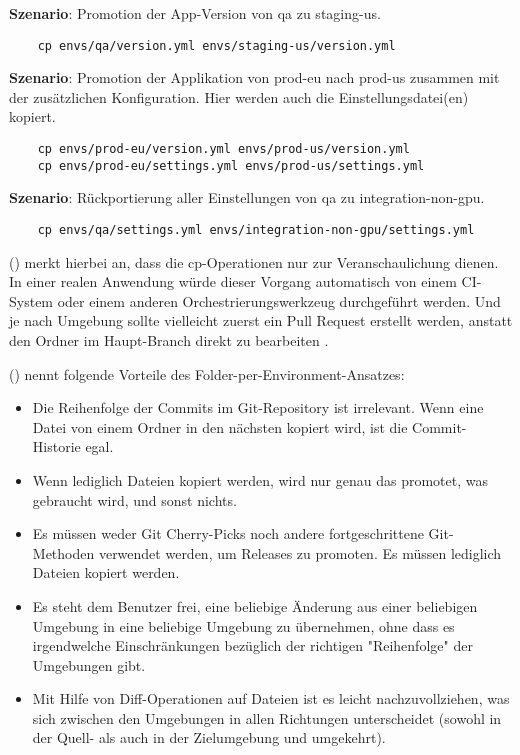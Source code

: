 \noindent
\textbf{Szenario}: Promotion der App-Version von qa zu staging-us.

\begin{verbatim}
	cp envs/qa/version.yml envs/staging-us/version.yml
\end{verbatim}

\noindent
\textbf{Szenario}: Promotion der Applikation von prod-eu nach prod-us zusammen mit der zusätzlichen Konfiguration. Hier werden auch die Einstellungsdatei(en) kopiert.

\begin{verbatim}
	cp envs/prod-eu/version.yml envs/prod-us/version.yml
	cp envs/prod-eu/settings.yml envs/prod-us/settings.yml
\end{verbatim}

\noindent
\textbf{Szenario}: Rückportierung aller Einstellungen von qa zu integration-non-gpu.

\begin{verbatim}
	cp envs/qa/settings.yml envs/integration-non-gpu/settings.yml
\end{verbatim}

\noindent
\citeauthor{codefreshHowToModelGitOpsEnvironmentsAndPromote} (\citeyear{codefreshHowToModelGitOpsEnvironmentsAndPromote})
merkt hierbei an,
dass die cp-Operationen nur zur Veranschaulichung dienen. 
In einer realen Anwendung würde dieser Vorgang automatisch von einem CI-System 
oder einem anderen Orchestrierungswerkzeug durchgeführt werden. Und je nach Umgebung 
sollte vielleicht zuerst ein Pull Request erstellt werden, anstatt den Ordner im Haupt-Branch direkt zu bearbeiten
\autocite{codefreshHowToModelGitOpsEnvironmentsAndPromote}.
\bigskip

\noindent
\citeauthor{codefreshHowToModelGitOpsEnvironmentsAndPromote} (\citeyear{codefreshHowToModelGitOpsEnvironmentsAndPromote})
nennt folgende Vorteile des Folder-per-Environment-Ansatzes:

\begin{itemize}
	\item Die Reihenfolge der Commits im Git-Repository ist irrelevant. Wenn eine Datei von einem Ordner in den nächsten kopiert wird, ist die Commit-Historie egal.
	\item Wenn lediglich Dateien kopiert werden, wird nur genau das promotet, was gebraucht wird, und sonst nichts.
	\item Es müssen weder Git Cherry-Picks noch andere fortgeschrittene Git-Methoden verwendet werden, um Releases zu promoten. Es müssen lediglich Dateien kopiert werden.
	\item Es steht dem Benutzer frei, eine beliebige Änderung aus einer beliebigen Umgebung in eine beliebige Umgebung zu übernehmen, ohne dass es irgendwelche Einschränkungen bezüglich der richtigen "Reihenfolge" der Umgebungen gibt.
	\item Mit Hilfe von Diff-Operationen auf Dateien ist es leicht nachzuvollziehen, was sich zwischen den Umgebungen in allen Richtungen unterscheidet (sowohl in der Quell- als auch in der Zielumgebung und umgekehrt).
\end{itemize}








